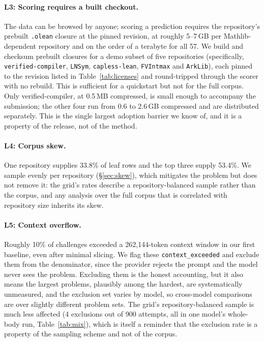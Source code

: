 \documentclass{article}
\begin{document}
\paragraph{L3: Scoring requires a built checkout.} The data can be browsed by anyone; scoring a
prediction requires the repository’s prebuilt \texttt{.olean} closure at the pinned revision, at
roughly 5--7\,GB per Mathlib-dependent repository and on the order of a terabyte for all 57. We
build and checksum prebuilt closures for a demo subset of five repositories (specifically, \texttt{verified-compiler},
\texttt{LNSym}, \texttt{capless-lean}, \texttt{FVIntmax} and \texttt{ArkLib}), each pinned to the revision listed in
Table~\ref{tab:licenses} and round-tripped through the scorer with no rebuild. This is
sufficient for a quickstart but not for the full corpus. Only verified-compiler, at 0.5\,MB
compressed, is small enough to accompany the submission; the other four run from 0.6 to 2.6\,GB
compressed and are distributed separately. This is the single largest adoption barrier we know
of, and it is a property of the release, not of the method.

\paragraph{L4: Corpus skew.} One repository supplies 33.8\% of leaf rows and the top three supply
53.4\%. We sample evenly per repository (\S\ref{sec:skew}), which mitigates the problem but does
not remove it: the grid’s rates describe a repository-balanced sample rather than the corpus, and
any analysis over the full corpus that is correlated with repository size inherits its skew.

\paragraph{L5: Context overflow.} Roughly 10\% of challenges exceeded a 262{,}144-token context
window in our first baseline, even after minimal slicing. We flag these
\texttt{context\_exceeded} and exclude them from the denominator, since the provider rejects the
prompt and the model never sees the problem. Excluding them is the honest accounting, but it also
means the largest problems, plausibly among the hardest, are systematically unmeasured, and
the exclusion set varies by model, so cross-model comparisons are over slightly different problem
sets. The grid’s repository-balanced sample is much less affected (4 exclusions out of 900 attempts,
all in one model’s whole-body run, Table~\ref{tab:mix}), which is itself a reminder that the
exclusion rate is a property of the sampling scheme and not of the corpus.
\end{document}
